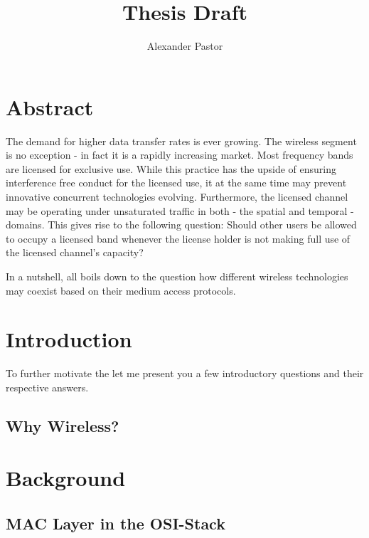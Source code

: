 \documentclass{article}
\begin{document}
	
\title{Thesis Draft}
\author{Alexander Pastor}
\maketitle

\clearpage
\tableofcontents
\clearpage

\section{Abstract}

The demand for higher data transfer rates is ever growing. The wireless segment is no exception - in fact it is a rapidly increasing market. Most frequency bands are licensed for exclusive use. While this practice has the upside of ensuring interference free conduct for the licensed use, it at the same time may prevent innovative concurrent technologies evolving. Furthermore, the licensed channel may be operating under unsaturated traffic in both - the spatial and temporal - domains. This gives rise to the following question: Should other users be allowed to occupy a licensed band whenever the license holder is not making full use of the licensed channel's capacity?

% 

In a nutshell, all boils down to the question how different wireless technologies may coexist based on their medium access protocols.

\section{Introduction}

To further motivate the let me present you a few introductory questions and their respective answers.

\subsection{Why Wireless?}

\section{Background}

\subsection{MAC Layer in the OSI-Stack}
\end{document}
